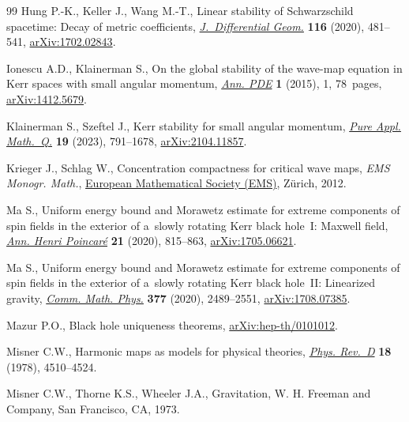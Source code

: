 \documentclass[pdftex]{sigma}
\numberwithin{equation}{section}
\begin{document}
\begin{thebibliography}{99}
Hung P.-K., Keller J., Wang M.-T., Linear stability of {S}chwarzschild spacetime:
 {D}ecay of metric coefficients,
 \href{https://doi.org/10.4310/jdg/1606964416}{\textit{J.~Differential Geom.}}
 \textbf{116} (2020), 481--541,
 \href{http://arxiv.org/abs/1702.02843}{arXiv:1702.02843}.

Ionescu A.D., Klainerman S., On the global stability of the wave-map equation
 in {K}err spaces with small angular momentum,
 \href{https://doi.org/10.1007/s40818-015-0001-1}{\textit{Ann. {PDE}}}
 \textbf{1} (2015), 1, 78~pages,
 \href{http://arxiv.org/abs/1412.5679}{arXiv:1412.5679}.

Klainerman S., Szeftel J., Kerr stability for small angular momentum,
 \href{https://doi.org/10.4310/pamq.2023.v19.n3.a1}{\textit{Pure Appl.
 Math.~Q.}} \textbf{19} (2023), 791--1678,
 \href{http://arxiv.org/abs/2104.11857}{arXiv:2104.11857}.

Krieger J., Schlag W., Concentration compactness for critical wave maps, \textit{EMS Monogr. Math.}, \href{https://doi.org/10.4171/106}{European Mathematical Society (EMS)}, Z\"urich, 2012.

Ma S., Uniform energy bound and {M}orawetz estimate for extreme components of
 spin fields in the exterior of a~slowly rotating {K}err black hole~{I}:
 {M}axwell field,
 \href{https://doi.org/10.1007/s00023-020-00884-7}{\textit{Ann. Henri
 Poincar\'e}} \textbf{21} (2020), 815--863,
 \href{http://arxiv.org/abs/1705.06621}{arXiv:1705.06621}.

Ma S., Uniform energy bound and {M}orawetz estimate for extreme components of
 spin fields in the exterior of a~slowly rotating {K}err black hole~{II}:
 {L}inearized gravity,
 \href{https://doi.org/10.1007/s00220-020-03777-2}{\textit{Comm. Math. Phys.}}
 \textbf{377} (2020), 2489--2551,
 \href{http://arxiv.org/abs/1708.07385}{arXiv:1708.07385}.

Mazur P.O., Black hole uniqueness theorems,
 \href{http://arxiv.org/abs/hep-th/0101012}{arXiv:hep-th/0101012}.

Misner C.W., Harmonic maps as models for physical theories,
 \href{https://doi.org/10.1103/PhysRevD.18.4510}{\textit{Phys. Rev.~D}}
 \textbf{18} (1978), 4510--4524.

Misner C.W., Thorne K.S., Wheeler J.A., Gravitation, W. H. Freeman and Company,
 San Francisco, CA, 1973.


\end{thebibliography}
\end{document}
